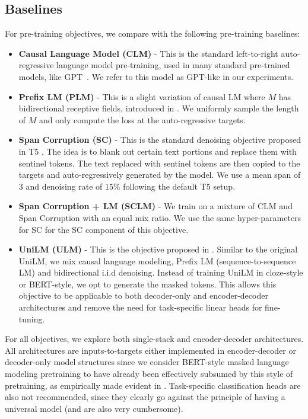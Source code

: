 \documentclass[10pt]{article}
\begin{document}
\subsection{Baselines}
For pre-training objectives, we compare with the following pre-training baselines:
\begin{itemize}
    \item \textbf{Causal Language Model (CLM)} - This is the standard left-to-right auto-regressive language model pre-training, used in many standard pre-trained models, like GPT~\citep{Radford2019,brown2020language}. We refer to this model as GPT-like in our experiments.
    \item \textbf{Prefix LM (PLM)} - This is a slight variation of causal LM where $M$ has bidirectional receptive fields, introduced in \citep{liu2018generating,raffel2019exploring}. We uniformly sample the length of $M$ and only compute the loss at the auto-regressive targets. 
    \item \textbf{Span Corruption (SC)} - This is the standard denoising objective proposed in T5 \citep{raffel2019exploring}. The idea is to blank out certain text portions and replace them with sentinel tokens. The text replaced with sentinel tokens are then copied to the targets and auto-regressively generated by the model. We use a mean span of $3$ and denoising rate of $15\%$ following the default T5 setup.  
    \item \textbf{Span Corruption + LM (SCLM)} - We train on a mixture of CLM and Span Corruption with an equal mix ratio. We use the same hyper-parameters for SC for the SC component of this objective.
    \item \textbf{UniLM (ULM)} - This is the objective proposed in \citet{dong2019unified}. Similar to the original UniLM, we mix causal language modeling, Prefix LM (sequence-to-sequence LM) and bidirectional i.i.d denoising. Instead of training UniLM in cloze-style or BERT-style, we opt to generate the masked tokens.  This allows this objective to be applicable to both decoder-only and encoder-decoder architectures and remove the need for task-specific linear heads for fine-tuning. 
\end{itemize}
For all objectives, we explore both single-stack and encoder-decoder architectures. All architectures are inputs-to-targets either implemented in encoder-decoder or decoder-only model structures since we consider BERT-style masked language modeling pretraining to have already been effectively subsumed by this style of pretraining, as empirically made evident in \citep{raffel2019exploring}. Task-specific classification heads are also not recommended, since they clearly go against the principle of having a universal model (and are also very cumbersome).
\end{document}
